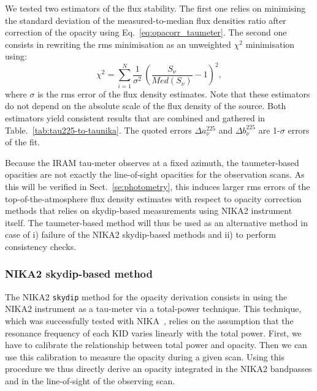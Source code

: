 We tested two estimators of the flux stability. The first one relies
on minimising the standard deviation of the measured-to-median flux
densities ratio after correction of the opacity using
Eq.~\ref{eq:opacorr_taumeter}. The second one consists in rewriting
the rms minimisation as an unweighted $\chi^2$ minimisation using:
\begin{equation}
\chi^2 = \sum_{i=1}^{N} \frac{1}{\sigma^2} \, \left( \frac{S_\nu}{Med(S_\nu)} -1 \right)^2,  
\end{equation}
where $\sigma$ is the rms error of the flux density estimates. Note
that these estimators do not depend on
the absolute scale of the flux density of the source. Both estimators
yield consistent results that are combined and gathered in
Table.~\ref{tab:tau225-to-taunika}. The quoted errors
$\Delta a_\nu^{225}$ and $\Delta b_\nu^{225}$ are 1-$\sigma$ errors of
the fit.

Because the IRAM tau-meter observes at a fixed azimuth, the
taumeter-based opacities are not exactly the line-of-sight opacities for
the observation scans. As this will be verified in
Sect.~\ref{se:photometry}, this induces larger rms errors of
the top-of-the-atmosphere flux density estimates with respect to
opacity correction methods that relies on skydip-based measurements using
NIKA2 instrument itself. The taumeter-based method will thus be used
as an alternative method in case of i) failure of the NIKA2 skydip-based
methods and ii) to perform consistency checks.



\subsubsection{NIKA2 skydip-based method}
\label{se:skydip-method}

The NIKA2 {\tt skydip} method for the opacity derivation consists in
using the NIKA2 instrument as a tau-meter via a total-power
technique. This technique, which was successfully tested with
NIKA~\citep{Catalano2014}, relies on the assumption that the
resonance frequency of each KID varies linearly with the total
power. First, we have to calibrate the relationship between total
power and opacity. Then we can use this calibration to measure the
opacity during a given scan. Using this procedure we thus directly
derive an opacity integrated in the NIKA2 bandpasses and in the
line-of-sight of the observing scan.

